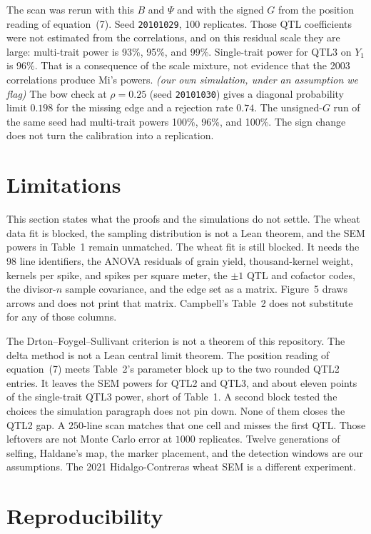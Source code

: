 \documentclass[11pt]{article}
\newcommand{\ev}[1]{\textup{\emph{(#1)}}}
\begin{document}
The scan was rerun with this $B$ and $\Psi$ and with the signed $G$ from the
position reading of equation~(7). Seed \texttt{20101029}, 100 replicates. Those
QTL coefficients were not estimated from the correlations, and on this
residual scale they are large: multi-trait power is 93\%, 95\%, and 99\%.
Single-trait power for QTL3 on $Y_1$ is 96\%. That is a consequence of the
scale mixture, not evidence that the 2003 correlations produce Mi's powers.
\ev{our own simulation, under an assumption we flag}
The bow check at $\rho=0.25$ (seed \texttt{20101030}) gives a diagonal
probability limit $0.198$ for the missing edge and a rejection rate $0.74$.
The unsigned-$G$ run of the same seed had multi-trait powers 100\%, 96\%, and
100\%. The sign change does not turn the calibration into a replication.

\section{Limitations}

This section states what the proofs and the simulations do not settle. The
wheat data fit is blocked, the sampling distribution is not a Lean theorem,
and the SEM powers in Table~1 remain unmatched. The wheat fit is still blocked. It needs the 98 line identifiers, the ANOVA
residuals of grain yield, thousand-kernel weight, kernels per spike, and
spikes per square meter, the $\pm 1$ QTL and cofactor codes, the divisor-$n$
sample covariance, and the edge set as a matrix. Figure~5 draws arrows and
does not print that matrix. Campbell's Table~2 does not substitute for any
of those columns.

The Drton--Foygel--Sullivant criterion is not a theorem of this repository.
The delta method is not a Lean central limit theorem. The position reading of
equation~(7) meets Table~2's parameter block up to the two rounded QTL2
entries. It leaves the SEM powers for QTL2 and QTL3, and about eleven points
of the single-trait QTL3 power, short of Table~1. A second block tested
the choices the simulation paragraph does not pin down. None of them
closes the QTL2 gap. A $250$-line scan matches that one cell and misses
the first QTL. Those leftovers are not Monte Carlo error at $1000$ replicates. Twelve
generations of selfing, Haldane's map, the marker placement, and the
detection windows are our assumptions. The 2021 Hidalgo-Contreras wheat SEM
is a different experiment.

\section{Reproducibility}
\end{document}
